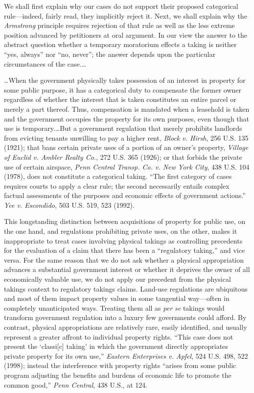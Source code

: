 We shall first explain why our cases do not support their proposed categorical
rule---indeed, fairly read, they implicitly reject it. Next, we shall explain
why the \textit{Armstrong} principle requires rejection of that rule as well as
the less extreme position advanced by petitioners at oral argument. In our view
the answer to the abstract question whether a temporary moratorium effects a
taking is neither ``yes, always'' nor ``no, never''; the answer depends upon the
particular circumstances of the case.\ldots



\ldots When the government physically takes possession of an interest in
property for some public purpose, it has a categorical duty to compensate the
former owner regardless of whether the interest that is taken constitutes an
entire parcel or merely a part thereof. Thus, compensation is mandated when a
leasehold is taken and the government occupies the property for its own
purposes, even though that use is temporary.\ldots But a government regulation
that merely prohibits landlords from evicting tenants unwilling to pay a higher
rent, \textit{Block v. Hirsh}, 256 U.S. 135 (1921); that bans certain private
uses of a portion of an owner's property, \textit{Village of Euclid v. Ambler
Realty Co.}, 272 U.S. 365 (1926); or that forbids the private use of certain
airspace, \textit{Penn Central Transp. Co. v. New York City}, 438 U.S. 104
(1978), does not constitute a categorical taking. ``The first category of cases
requires courts to apply a clear rule; the second necessarily entails complex
factual assessments of the purposes and economic effects of government
actions.'' \textit{Yee v. Escondido}, 503 U.S. 519, 523 (1992).

This longstanding distinction between acquisitions of property for public use,
on the one hand, and regulations prohibiting private uses, on the other, makes
it inappropriate to treat cases involving physical takings as controlling
precedents for the evaluation of a claim that there has been a ``regulatory
taking,'' and vice versa. For the same reason that we do not ask whether a
physical appropriation advances a substantial government interest or whether it
deprives the owner of all economically valuable use, we do not apply our
precedent from the physical takings context to regulatory takings claims.
Land-use regulations are ubiquitous and most of them impact property values in
some tangential way---often in completely unanticipated ways. Treating them all
as \textit{per se} takings would transform government regulation into a luxury
few governments could afford. By contrast, physical appropriations are
relatively rare, easily identified, and usually represent a greater affront to
individual property rights. ``This case does not present the `classi[c] taking'
in which the government directly appropriates private property for its own
use,'' \textit{Eastern Enterprises v. Apfel}, 524 U.S. 498, 522 (1998); instead
the interference with property rights ``arises from some public program
adjusting the benefits and burdens of economic life to promote the common
good,'' \textit{Penn Central}, 438 U.S., at 124.

